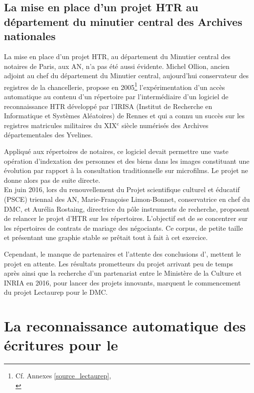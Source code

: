 \subsection{La mise en place d'un projet HTR au département du minutier central des Archives nationales}

La mise en place d'un projet HTR, au département du Minutier central des notaires de Paris, aux AN, n'a pas été aussi évidente. Michel Ollion, ancien adjoint au chef du département du Minutier central, aujourd'hui conservateur des registres de la chancellerie, propose en 2005\footnote{Cf. Annexes \ref{source_lectaurep},\\ } l'expérimentation d'un accès automatique au contenu d'un répertoire par l'intermédiaire d'un logiciel de reconnaissance HTR développé par l'IRISA (Institut de Recherche en Informatique et Systèmes Aléatoires) de Rennes et qui a connu un succès sur les registres matricules militaires du XIX$^{e}$ siècle numérisés des Archives départementales des Yvelines.

Appliqué aux répertoires de notaires, ce logiciel devait permettre une vaste opération d'indexation des personnes et des biens dans les images constituant une évolution par rapport à la consultation traditionnelle sur microfilms. Le projet ne donne alors pas de suite directe.\\

En juin 2016, lors du renouvellement du Projet scientifique culturel et éducatif (PSCE) triennal des AN, Marie-Françoise Limon-Bonnet, conservatrice en chef du DMC, et Aurélia Rostaing, directrice du pôle instruments de recherche, proposent de relancer le projet d'HTR sur les répertoires. L'objectif est de se concentrer sur les répertoires de contrats de mariage des négociants. Ce corpus, de petite taille et présentant une graphie stable se prêtait tout à fait à cet exercice. 

Cependant, le manque de partenaires et l'attente des conclusions d', mettent le projet en attente. Les résultats prometteurs du projet  arrivant peu de temps après ainsi que la recherche d'un partenariat entre le Ministère de la Culture et INRIA en 2016, pour lancer des projets innovants, marquent le commencement du projet Lectaurep pour le DMC.
\newpage

\section{La reconnaissance automatique des écritures pour le }

